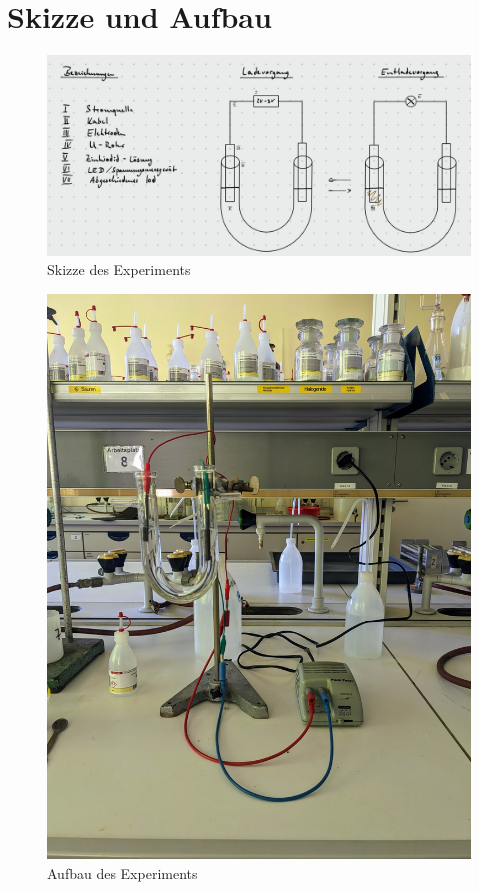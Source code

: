 \documentclass[11pt]{article}
\begin{document}
\section{Skizze und Aufbau}
\begin{figure}[h!]
    \centering
    \caption{Skizze des Experiments}
    \label{fig:skizze}
    \includegraphics[scale=0.185]{figure.png}
\end{figure}
\begin{figure}[h!]
    \centering
    \caption{Aufbau des Experiments}
    \label{fig:aufbau}
    \includegraphics[scale=0.08]{aufbau.jpg}
\end{figure}
\end{document}
